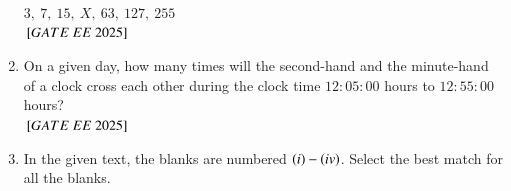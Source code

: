 \documentclass[journal,12pt,onecolumn]{IEEEtran}
\theoremstyle{remark}
\begin{document}
\begin{enumerate}
$3,\ 7,\ 15,\ X,\ 63,\ 127,\ 255$
\\
\hfill ${}\left[GATE\ EE\ 2025\right]$
    \begin{enumerate}
    \end{enumerate}
\item  On a given day, how many times will the second-hand and the minute-hand of a clock cross each other during the clock time $12:05:00$ hours to $12:55:00$ hours?\\
\hfill ${}\left[GATE\ EE\ 2025\right]$
    \begin{enumerate}
    \end{enumerate}
\item In the given text, the blanks are numbered $\left(i\right)- \left(iv\right)$. Select the best match for all the blanks.

 


\end{enumerate}
\end{document}

